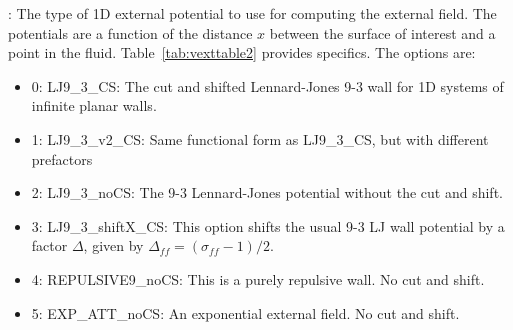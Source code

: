 \documentclass[10pt,onecolumn]{article}
\begin{document}
\vspace{0.1in}
\vspace{0.1in}
:  The type of 1D external potential to use for computing the external field.  
The potentials are a function of the distance $x$ between the surface of interest and a point in the fluid.  Table~\ref{tab:vexttable2} provides specifics.  The options are:
\begin{itemize}
\item{0: LJ9\_3\_CS: The cut and shifted Lennard-Jones 9-3 wall for 1D systems
of infinite planar walls.}
\item{1: LJ9\_3\_v2\_CS: Same functional form as  LJ9\_3\_CS, but with different prefactors}
\item{2:  LJ9\_3\_noCS:  The 9-3 Lennard-Jones potential without the cut and shift.}
\item{3: LJ9\_3\_shiftX\_CS: This option shifts the usual 9-3 LJ wall potential by a factor $\Delta$, given by $\Delta_{ff} = (\sigma_{ff}-1)/2$.}
\item{4: REPULSIVE9\_noCS: This is a purely repulsive wall.  No cut and shift.}
\item{5: EXP\_ATT\_noCS:  An exponential external field.  No cut and shift.}
\end{itemize}
\end{document}
